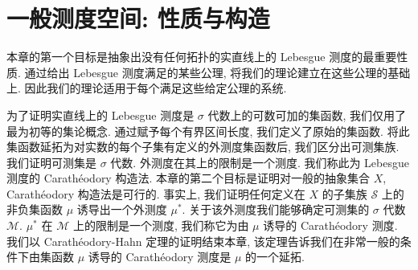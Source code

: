 \documentclass[../main.tex]{subfiles}
\begin{document}
\chapter{一般测度空间: 性质与构造}\label{chapter:ch17-general-measure}

本章的第一个目标是抽象出没有任何拓扑的实直线上的 Lebesgue 测度的最重要性质. 通过给出 Lebesgue 测度满足的某些公理, 将我们的理论建立在这些公理的基础上. 因此我们的理论适用于每个满足这些给定公理的系统.

为了证明实直线上的 Lebesgue 测度是 $\sigma$ 代数上的可数可加的集函数, 我们仅用了最为初等的集论概念. 通过赋予每个有界区间长度, 我们定义了原始的集函数. 将此集函数延拓为对实数的每个子集有定义的外测度集函数后, 我们区分出可测集族. 我们证明可测集是 $\sigma$ 代数. 外测度在其上的限制是一个测度. 我们称此为 Lebesgue 测度的 Carath\'eodory 构造法. 本章的第二个目标是证明对一般的抽象集合 $X$, Carath\'eodory 构造法是可行的. 事实上, 我们证明任何定义在 $X$ 的子集族 $\mathcal{S}$ 上的非负集函数 $\mu$ 诱导出一个外测度 $\mu^*$. 关于该外测度我们能够确定可测集的 $\sigma$ 代数 $\mathcal{M}$. $\mu^*$ 在 $\mathcal{M}$ 上的限制是一个测度, 我们称它为由 $\mu$ 诱导的 Carath\'eodory 测度. 我们以 Carath\'eodory-Hahn 定理的证明结束本章, 该定理告诉我们在非常一般的条件下由集函数 $\mu$ 诱导的 Carath\'eodory 测度是 $\mu$ 的一个延拓.










\end{document}
